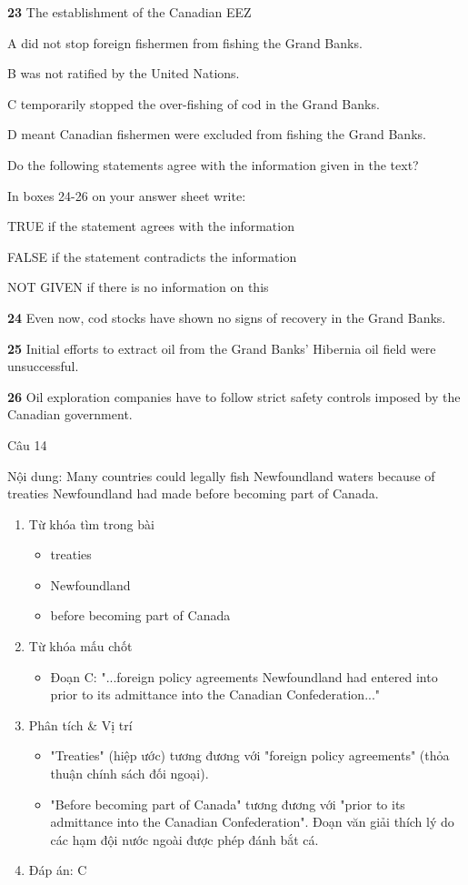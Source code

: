 \documentclass{../templateReading/cdreading}
\begin{document}
\textbf{23} The establishment of the Canadian EEZ

A   did not stop foreign fishermen from fishing the Grand Banks.

B   was not ratified by the United Nations.

C   temporarily stopped the over-fishing of cod in the Grand Banks.

D   meant Canadian fishermen were excluded from fishing the Grand Banks.


Do the following statements agree with the information given in the text?

In boxes 24-26 on your answer sheet write:

TRUE               if the statement agrees with the information

FALSE              if the statement contradicts the information

NOT GIVEN    if there is no information on this

\textbf{24} Even now, cod stocks have shown no signs of recovery in the Grand Banks.

\textbf{25} Initial efforts to extract oil from the Grand Banks’ Hibernia oil field were unsuccessful.

\textbf{26} Oil exploration companies have to follow strict safety controls imposed by the Canadian government.


Câu 14

Nội dung: Many countries could legally fish Newfoundland waters because of treaties Newfoundland had made before becoming part of Canada.
\begin{enumerate}
\item Từ khóa tìm trong bài
\begin{itemize}
\item treaties
\item Newfoundland
\item before becoming part of Canada
\end{itemize}
\item Từ khóa mấu chốt
\begin{itemize}
\item Đoạn C: "...foreign policy agreements Newfoundland had entered into prior to its admittance into the Canadian Confederation..."
\end{itemize}
\item Phân tích \& Vị trí
\begin{itemize}
\item "Treaties" (hiệp ước) tương đương với "foreign policy agreements" (thỏa thuận chính sách đối ngoại).
\item "Before becoming part of Canada" tương đương với "prior to its admittance into the Canadian Confederation". Đoạn văn giải thích lý do các hạm đội nước ngoài được phép đánh bắt cá.
\end{itemize}
\item Đáp án: C
\end{enumerate}
\end{document}
